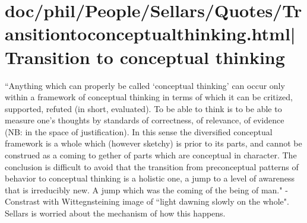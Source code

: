 \documentclass[12pt,a4paper]{report}
\begin{document}
\chapter{doc/phil/People/Sellars/Quotes/Transitiontoconceptualthinking.html|Transition to conceptual thinking}
``Anything which can properly be called `conceptual thinking' can occur only within a framework of conceptual thinking in terms of which it can be critized, supported, refuted (in short, evaluated). To be able to think is to be able to measure one's thoughts by standards of correctness, of relevance, of evidence (NB: in the space of justification). In this sense the diversified conceptual framework is a whole which (however sketchy) is prior to its parts, and cannot be construed as a coming to gether of parts which are conceptual in character. The conclusion is difficult to avoid that the transition from preconceptual patterns of behavior to conceptual thinking is a holistic one, a jump to a level of awareness that is irreducibly new. A jump which was the coming of the being of man." - Constrast with Wittegnsteining image of ``light dawning slowly on the whole". Sellars is worried about the mechanism of how this happens.



\end{document}

